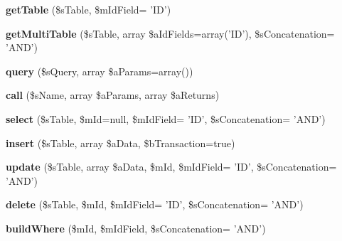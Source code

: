 \begin{DoxyCompactItemize}
\item 
\hypertarget{class_db_connection_a9d5cbd5705cb5474feee805cc5df642c}{{\bfseries get\-Table} (\$s\-Table, \$m\-Id\-Field= 'I\-D')}\label{class_db_connection_a9d5cbd5705cb5474feee805cc5df642c}

\item 
\hypertarget{class_db_connection_a42a1ee80940d4642d210115193523403}{{\bfseries get\-Multi\-Table} (\$s\-Table, array \$a\-Id\-Fields=array('I\-D'), \$s\-Concatenation= 'A\-N\-D')}\label{class_db_connection_a42a1ee80940d4642d210115193523403}

\item 
\hypertarget{class_db_connection_ae5144ffd2bfc7fff6bb4847d293e26d8}{{\bfseries query} (\$s\-Query, array \$a\-Params=array())}\label{class_db_connection_ae5144ffd2bfc7fff6bb4847d293e26d8}

\item 
\hypertarget{class_db_connection_a96b5e2fdad36ec81aae1a3a26ad7acd7}{{\bfseries call} (\$s\-Name, array \$a\-Params, array \$a\-Returns)}\label{class_db_connection_a96b5e2fdad36ec81aae1a3a26ad7acd7}

\item 
\hypertarget{class_db_connection_ac0fd349a2a6521372a9b68eeb48e4fab}{{\bfseries select} (\$s\-Table, \$m\-Id=null, \$m\-Id\-Field= 'I\-D', \$s\-Concatenation= 'A\-N\-D')}\label{class_db_connection_ac0fd349a2a6521372a9b68eeb48e4fab}

\item 
\hypertarget{class_db_connection_ab9c7b4ab2255582a534f59f8af9af629}{{\bfseries insert} (\$s\-Table, array \$a\-Data, \$b\-Transaction=true)}\label{class_db_connection_ab9c7b4ab2255582a534f59f8af9af629}

\item 
\hypertarget{class_db_connection_afe5a8ecd5852cd3a8a713d1775372676}{{\bfseries update} (\$s\-Table, array \$a\-Data, \$m\-Id, \$m\-Id\-Field= 'I\-D', \$s\-Concatenation= 'A\-N\-D')}\label{class_db_connection_afe5a8ecd5852cd3a8a713d1775372676}

\item 
\hypertarget{class_db_connection_a2da0f32a8ea737be8043a6ec0fe4635e}{{\bfseries delete} (\$s\-Table, \$m\-Id, \$m\-Id\-Field= 'I\-D', \$s\-Concatenation= 'A\-N\-D')}\label{class_db_connection_a2da0f32a8ea737be8043a6ec0fe4635e}

\item 
\hypertarget{class_db_connection_a2c260a0d5e6452a7b2771cbc40205b48}{{\bfseries build\-Where} (\$m\-Id, \$m\-Id\-Field, \$s\-Concatenation= 'A\-N\-D')}\label{class_db_connection_a2c260a0d5e6452a7b2771cbc40205b48}

\end{DoxyCompactItemize}


